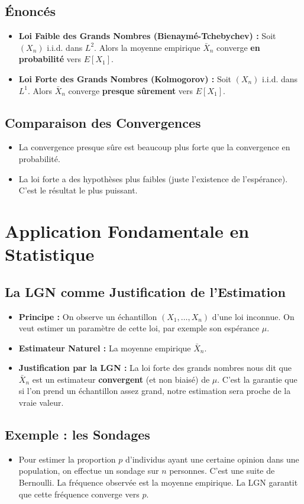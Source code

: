 \documentclass[12pt, a4paper, parskip=full]{report}
\theoremstyle{agregstyle}
\begin{document}
\subsection{Énoncés}
\begin{itemize}
    \item \textbf{Loi Faible des Grands Nombres (Bienaymé-Tchebychev) :} Soit $(X_n)$ i.i.d. dans $L^2$. Alors la moyenne empirique $\bar{X}_n$ converge \textbf{en probabilité} vers $E[X_1]$.
    \item \textbf{Loi Forte des Grands Nombres (Kolmogorov) :} Soit $(X_n)$ i.i.d. dans $L^1$. Alors $\bar{X}_n$ converge \textbf{presque sûrement} vers $E[X_1]$.
\end{itemize}
\subsection{Comparaison des Convergences}
\begin{itemize}
    \item La convergence presque sûre est beaucoup plus forte que la convergence en probabilité.
    \item La loi forte a des hypothèses plus faibles (juste l'existence de l'espérance). C'est le résultat le plus puissant.
\end{itemize}

\section{Application Fondamentale en Statistique}
\subsection{La LGN comme Justification de l'Estimation}
\begin{itemize}
    \item \textbf{Principe :} On observe un échantillon $(X_1, \dots, X_n)$ d'une loi inconnue. On veut estimer un paramètre de cette loi, par exemple son espérance $\mu$.
    \item \textbf{Estimateur Naturel :} La moyenne empirique $\bar{X}_n$.
    \item \textbf{Justification par la LGN :} La loi forte des grands nombres nous dit que $\bar{X}_n$ est un estimateur \textbf{convergent} (et non biaisé) de $\mu$. C'est la garantie que si l'on prend un échantillon assez grand, notre estimation sera proche de la vraie valeur.
\end{itemize}
\subsection{Exemple : les Sondages}
\begin{itemize}
    \item Pour estimer la proportion $p$ d'individus ayant une certaine opinion dans une population, on effectue un sondage sur $n$ personnes. C'est une suite de Bernoulli. La fréquence observée est la moyenne empirique. La LGN garantit que cette fréquence converge vers $p$.
\end{itemize}
\end{document}
